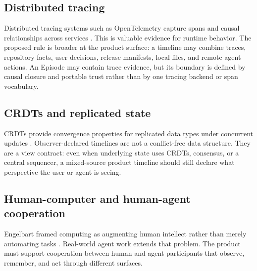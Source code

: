 \subsection{Distributed tracing}

Distributed tracing systems such as OpenTelemetry capture spans and causal
relationships across services \cite{opentelemetry}. This is valuable evidence
for runtime behavior. The proposed rule is broader at the product surface: a
timeline may combine traces, repository facts, user decisions, release
manifests, local files, and remote agent actions. An Episode may contain trace
evidence, but its boundary is defined by causal closure and portable trust rather
than by one tracing backend or span vocabulary.

\subsection{CRDTs and replicated state}

CRDTs provide convergence properties for replicated data types under
concurrent updates \cite{shapiro2011crdt}. Observer-declared timelines are not
a conflict-free data structure. They are a view contract: even when underlying
state uses CRDTs, consensus, or a central sequencer, a mixed-source product
timeline should still declare what perspective the user or agent is seeing.

\subsection{Human-computer and human-agent cooperation}

Engelbart framed computing as augmenting human intellect rather than merely
automating tasks \cite{engelbart1962augmenting}. Real-world agent work extends
that problem. The product must support cooperation between human and agent
participants that observe, remember, and act through different surfaces.

